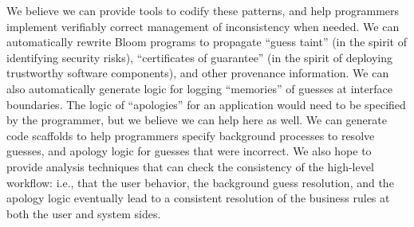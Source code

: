 We believe we can provide tools to codify these patterns, and help programmers implement verifiably correct management of inconsistency when needed.  We can automatically rewrite Bloom programs to propagate ``guess taint'' (in the spirit of identifying security risks), ``certificates of guarantee'' (in the spirit of deploying trustworthy software components), and other provenance information.  We can also automatically generate logic for logging ``memories'' of guesses at interface boundaries.  The logic of ``apologies'' for an application would need to be specified by the programmer, but we believe we can help here as well.  We can generate code scaffolds to help programmers specify background processes to resolve guesses, and apology logic for guesses that were incorrect.  We also hope to provide analysis techniques that can check the consistency of the high-level workflow: i.e., that the user behavior, the background guess resolution, and the apology logic eventually lead to a consistent resolution of the business rules at both the user and system sides.

